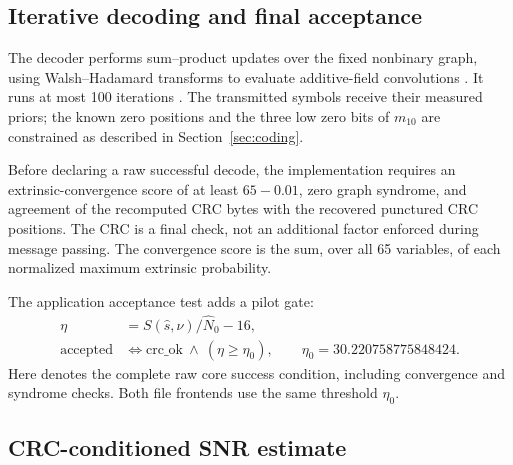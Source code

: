 \documentclass[11pt,a4paper]{article}
\newcommand{\Nzero}{\widehat{N}_0}
\newcommand{\Gate}{30.220758775848424}
\begin{document}
\subsection{Iterative decoding and final acceptance}

The decoder performs sum--product updates over the fixed nonbinary graph,
using Walsh--Hadamard transforms to evaluate additive-field convolutions
\cite{sumproduct,coding}.
It runs at most 100 iterations \cite{coding}. The transmitted symbols receive their
measured priors; the known zero positions and the three low zero bits of
$m_{10}$ are constrained as described in Section~\ref{sec:coding}.

Before declaring a raw successful decode, the implementation requires
an extrinsic-convergence score of at least $65-0.01$, zero graph syndrome,
and agreement of the recomputed CRC bytes with the recovered punctured
CRC positions. The CRC is a final check, not an additional factor enforced during message passing. The convergence score is the sum, over all 65 variables,
of each normalized maximum extrinsic probability.

The application acceptance test adds a pilot gate:
\begin{align}
  \eta &= S(\widehat s,\widehat\nu)/\Nzero-16, \label{eq:evidence}\\
  \mathrm{accepted} &\iff \mathrm{crc\_ok}\ \land\ (\eta\ge\eta_0),
  \qquad \eta_0=\Gate. \label{eq:accept}
\end{align}
Here  denotes the complete raw core success condition,
including convergence and syndrome checks. Both file frontends use the
same threshold $\eta_0$.

\subsection{CRC-conditioned SNR estimate}
\end{document}
